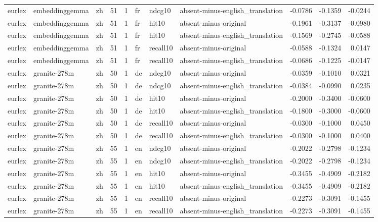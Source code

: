 \begin{tabular}{lllrrlllrrr}
eurlex & embeddinggemma & zh & 51 & 1 & fr & ndcg10 & absent-minus-english\_translation & -0.0786 & -0.1359 & -0.0244 \\
eurlex & embeddinggemma & zh & 51 & 1 & fr & hit10 & absent-minus-original & -0.1961 & -0.3137 & -0.0980 \\
eurlex & embeddinggemma & zh & 51 & 1 & fr & hit10 & absent-minus-english\_translation & -0.1569 & -0.2745 & -0.0588 \\
eurlex & embeddinggemma & zh & 51 & 1 & fr & recall10 & absent-minus-original & -0.0588 & -0.1324 & 0.0147 \\
eurlex & embeddinggemma & zh & 51 & 1 & fr & recall10 & absent-minus-english\_translation & -0.0686 & -0.1225 & -0.0147 \\
eurlex & granite-278m & zh & 50 & 1 & de & ndcg10 & absent-minus-original & -0.0359 & -0.1010 & 0.0321 \\
eurlex & granite-278m & zh & 50 & 1 & de & ndcg10 & absent-minus-english\_translation & -0.0384 & -0.0990 & 0.0235 \\
eurlex & granite-278m & zh & 50 & 1 & de & hit10 & absent-minus-original & -0.2000 & -0.3400 & -0.0600 \\
eurlex & granite-278m & zh & 50 & 1 & de & hit10 & absent-minus-english\_translation & -0.1800 & -0.3000 & -0.0600 \\
eurlex & granite-278m & zh & 50 & 1 & de & recall10 & absent-minus-original & -0.0300 & -0.1000 & 0.0450 \\
eurlex & granite-278m & zh & 50 & 1 & de & recall10 & absent-minus-english\_translation & -0.0300 & -0.1000 & 0.0400 \\
eurlex & granite-278m & zh & 55 & 1 & en & ndcg10 & absent-minus-original & -0.2022 & -0.2798 & -0.1234 \\
eurlex & granite-278m & zh & 55 & 1 & en & ndcg10 & absent-minus-english\_translation & -0.2022 & -0.2798 & -0.1234 \\
eurlex & granite-278m & zh & 55 & 1 & en & hit10 & absent-minus-original & -0.3455 & -0.4909 & -0.2182 \\
eurlex & granite-278m & zh & 55 & 1 & en & hit10 & absent-minus-english\_translation & -0.3455 & -0.4909 & -0.2182 \\
eurlex & granite-278m & zh & 55 & 1 & en & recall10 & absent-minus-original & -0.2273 & -0.3091 & -0.1455 \\
eurlex & granite-278m & zh & 55 & 1 & en & recall10 & absent-minus-english\_translation & -0.2273 & -0.3091 & -0.1455 \\

\end{tabular}

